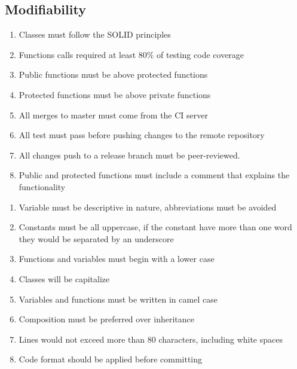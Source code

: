 \subsection{Modifiability}
\begin{enumerate}[label=MOD-\arabic*]
    \item Classes must follow the SOLID principles
    \item Functions calls required at least 80\% of testing code coverage
    \item Public functions must be above protected functions
    \item Protected functions must be above private functions
    \item All merges to master must come from the CI server
    \item All test must pass before pushing changes to the remote repository
    \item All changes push to a release branch must be peer-reviewed.
    \item Public and protected functions must include a comment that explains 
    the functionality
\end{enumerate}
\pagebreak
\begin{enumerate}[resume, label=MOD-\arabic*]
    \item Variable must be descriptive in nature, abbreviations must be avoided
    \item Constants must be all uppercase, if the constant have more than one 
    word they would be separated by an underscore
    \item Functions and variables must begin with a lower case
    \item Classes will be capitalize
    \item Variables and functions must be written in camel case
    \item Composition must be preferred over inheritance
    \item Lines would not exceed more than 80 characters, including white 
    spaces
    \item Code format should be applied before committing
\end{enumerate}

